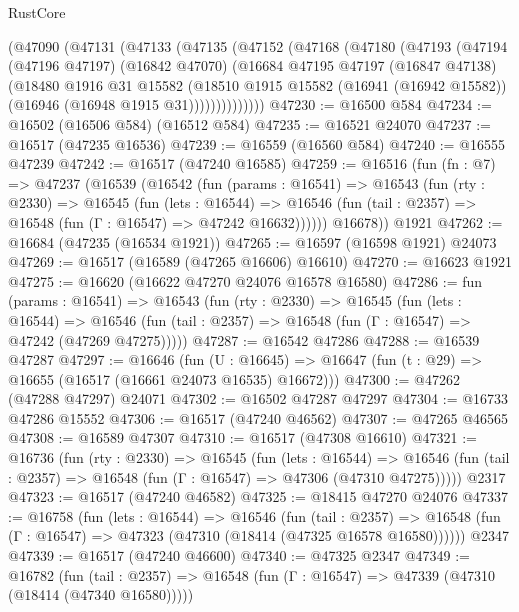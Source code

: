 \begin{lexlean}{RustCore}
\begin{coremodule}
    (@47090
      (@47131
        (@47133
          (@47135
            (@47152
              (@47168
                (@47180
                  (@47193
                    (@47194
                      (@47196 @47197)
                      (@16842 @47070)
                      (@16684
                        @47195
                        @47197
                        (@16847 @47138)
                        (@18480
                          @1916
                          @31
                          @15582
                          (@18510
                            @1915
                            @15582
                            (@16941 (@16942 @15582))
                            (@16946 (@16948 @1915 @31))))))))))))))
@47230 := @16500 @584
@47234 := @16502 (@16506 @584) (@16512 @584)
@47235 := @16521 @24070
@47237 := @16517 (@47235 @16536)
@47239 := @16559 (@16560 @584)
@47240 := @16555 @47239
@47242 := @16517 (@47240 @16585)
@47259 := @16516
    (fun (fn : @7) =>
    @47237
      (@16539
        (@16542
          (fun (params : @16541) =>
          @16543
            (fun (rty : @2330) =>
            @16545
              (fun (lets : @16544) =>
              @16546 (fun (tail : @2357) => @16548 (fun (Γ : @16547) => @47242 @16632))))))
        @16678))
    @1921
@47262 := @16684 (@47235 (@16534 @1921))
@47265 := @16597 (@16598 @1921) @24073
@47269 := @16517 (@16589 (@47265 @16606) @16610)
@47270 := @16623 @1921
@47275 := @16620 (@16622 @47270 @24076 @16578 @16580)
@47286 := fun (params : @16541) =>
  @16543
    (fun (rty : @2330) =>
    @16545
      (fun (lets : @16544) =>
      @16546 (fun (tail : @2357) => @16548 (fun (Γ : @16547) => @47242 (@47269 @47275)))))
@47287 := @16542 @47286
@47288 := @16539 @47287
@47297 := @16646
    (fun (U : @16645) => @16647 (fun (t : @29) => @16655 (@16517 (@16661 @24073 @16535) @16672)))
@47300 := @47262 (@47288 @47297) @24071
@47302 := @16502 @47287 @47297
@47304 := @16733 @47286 @15552
@47306 := @16517 (@47240 @46562)
@47307 := @47265 @46565
@47308 := @16589 @47307
@47310 := @16517 (@47308 @16610)
@47321 := @16736
    (fun (rty : @2330) =>
    @16545
      (fun (lets : @16544) =>
      @16546 (fun (tail : @2357) => @16548 (fun (Γ : @16547) => @47306 (@47310 @47275)))))
    @2317
@47323 := @16517 (@47240 @46582)
@47325 := @18415 @47270 @24076
@47337 := @16758
    (fun (lets : @16544) =>
    @16546
      (fun (tail : @2357) =>
      @16548 (fun (Γ : @16547) => @47323 (@47310 (@18414 (@47325 @16578 @16580))))))
    @2347
@47339 := @16517 (@47240 @46600)
@47340 := @47325 @2347
@47349 := @16782
    (fun (tail : @2357) => @16548 (fun (Γ : @16547) => @47339 (@47310 (@18414 (@47340 @16580)))))

\end{coremodule}
\end{lexlean}
